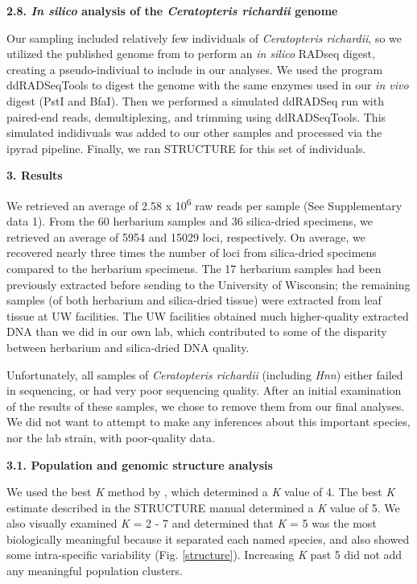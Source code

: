 \documentclass[12pt]{article}
\begin{document}
\begin{flushleft}
\textbf{2.8. \textit{In silico} analysis of the \textit{Ceratopteris richardii} genome}

Our sampling included relatively few individuals of \textit{Ceratopteris richardii}, so we utilized the published genome from \textcite{Marchant2019} to perform an \textit{in silico} RADseq digest, creating a pseudo-indiviual to include in our analyses. We used the program ddRADSeqTools \autocite{Mora-Marquez2017} to digest the genome with the same enzymes used in our \textit{in vivo} digest (PstI and BfaI). Then we performed a simulated ddRADSeq run with paired-end reads, demultiplexing, and trimming using ddRADSeqTools. This simulated indidivuals was added to our other samples and processed via the ipyrad pipeline. Finally, we ran STRUCTURE for this set of individuals. 

\vspace{1cm}

{\large\textbf{3. Results}}

We retrieved an average of 2.58 x 10\textsuperscript{6} raw reads per sample (See Supplementary data 1). From the 60 herbarium samples and 36 silica-dried specimens, we retrieved an average of 5954 and 15029 loci, respectively. On average, we recovered nearly three times the number of loci from silica-dried specimens compared to the herbarium specimens. The 17 herbarium samples had been previously extracted before sending to the University of Wisconsin; the remaining samples (of both herbarium and silica-dried tissue) were extracted from leaf tissue at UW facilities. The UW facilities obtained much higher-quality extracted DNA than we did in our own lab, which contributed to some of the disparity between herbarium and silica-dried DNA quality.

Unfortunately, all samples of \textit{Ceratopteris richardii} (including \textit{Hnn}) either failed in sequencing, or had very poor sequencing quality. After an initial examination of the results of these samples, we chose to remove them from our final analyses. We did not want to attempt to make any inferences about this important species, nor the lab strain, with poor-quality data. 

\textbf{3.1. Population and genomic structure analysis}

We used the best \textit{K} method by \textcite{Evanno2005}, which determined a \textit{K} value of 4. The best \textit{K} estimate described in the STRUCTURE manual \autocite{Pritchard2000} determined a \textit{K} value of 5. We also visually examined \textit{K} = 2 - 7 and determined that \textit{K} = 5 was the most biologically meaningful because it separated each named species, and also showed some intra-specific variability (Fig. \ref{structure}). Increasing \textit{K} past 5 did not add any meaningful population clusters. 


\end{flushleft}
\end{document}
